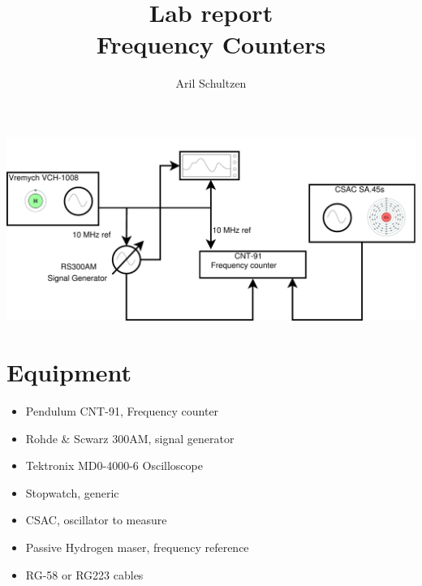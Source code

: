 \documentclass[11pt,english,a4paper]{article}
\title{Lab report \\ Frequency Counters}
\author{Aril Schultzen}
\begin{document}
\maketitle
\tableofcontents
\includegraphics[width=1 \textwidth]{lab_report_diagram.pdf}


\section{Equipment}
\begin{itemize}
  \item Pendulum CNT-91, Frequency counter
  \item Rohde \& Scwarz 300AM, signal generator
  \item Tektronix MD0-4000-6 Oscilloscope
  \item Stopwatch, generic
  \item CSAC, oscillator to measure
  \item Passive Hydrogen maser, frequency reference
  \item RG-58 or RG223 cables
\end{itemize}
\end{document}

